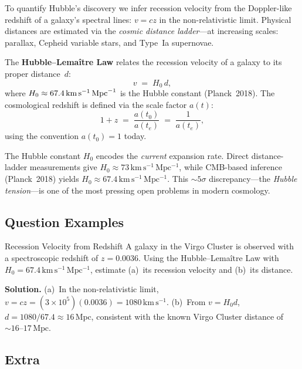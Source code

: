 \begin{theory}
To quantify Hubble's discovery we infer recession velocity from the Doppler-like
redshift of a galaxy's spectral lines: $v = cz$ in the non-relativistic limit.
Physical distances are estimated via the \emph{cosmic distance ladder}—at
increasing scales: parallax, Cepheid variable stars, and Type~Ia supernovae.

The \textbf{Hubble--Lema\^itre Law} relates the recession velocity of a galaxy to its
proper distance~$d$:
\begin{equation}
  v \;=\; H_0 \, d,
  \label{eq:hubble}
\end{equation}
where $H_0 \approx 67.4 \,\mathrm{km\,s^{-1}}\,\mathrm{Mpc}^{-1}$ is the Hubble constant (Planck~2018).
The cosmological redshift is defined via the scale factor $a(t)$:
\begin{equation}
  1 + z \;=\; \frac{a(t_0)}{a(t_e)} \;=\; \frac{1}{a(t_e)},
  \label{eq:redshift}
\end{equation}
using the convention $a(t_0)=1$ today.

The Hubble constant $H_0$ encodes the \emph{current} expansion rate.
Direct distance-ladder measurements give $H_0 \approx 73\,\mathrm{km\,s^{-1}\,Mpc^{-1}}$,
while CMB-based inference (Planck~2018) yields $H_0 \approx 67.4\,\mathrm{km\,s^{-1}\,Mpc^{-1}}$.
This $\sim5\sigma$ discrepancy—the \emph{Hubble tension}—is one of the most pressing
open problems in modern cosmology.
\end{theory}

\subsection{Question Examples}

\begin{example}{Recession Velocity from Redshift}{}
A galaxy in the Virgo Cluster is observed with a spectroscopic redshift of $z = 0.0036$.
Using the Hubble--Lema\^itre Law with $H_0 = 67.4\,\mathrm{km\,s^{-1}\,Mpc^{-1}}$,
estimate (a)~its recession velocity and (b)~its distance.

\medskip\textbf{Solution.}\quad
(a)~In the non-relativistic limit, $v = cz = (3\times10^5)(0.0036)
= 1080\,\mathrm{km\,s^{-1}}$.
(b)~From $v = H_0 d$, $d = 1080/67.4 \approx 16\,\mathrm{Mpc}$, consistent with
the known Virgo Cluster distance of $\sim16$--$17\,\mathrm{Mpc}$.
\end{example}

\subsection{Extra}

